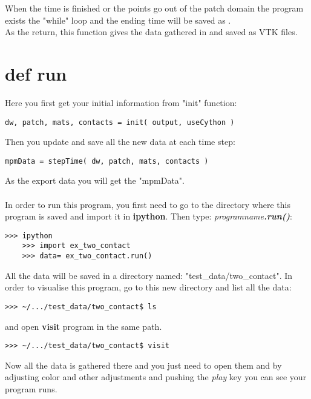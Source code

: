 When the time is finished or the points go out of the patch domain the program exists the "while" loop and the ending time will be saved as .\\
As the return, this function gives the data gathered in  and saved as VTK files.
\section{def run}
Here you first get your initial information from "init" function:
\begin{lstlisting}
dw, patch, mats, contacts = init( output, useCython )
\end{lstlisting}
Then you update and save all the new data at each time step:
\begin{lstlisting}
mpmData = stepTime( dw, patch, mats, contacts )
\end{lstlisting}

As the export data you will get the "mpmData".\\ \\ 


In order to run this program, you first need to go to the directory where this program is saved and import it in \textbf{ipython}. Then type: \emph{programname}\textbf{\emph{.run()}}:
\begin{lstlisting}
>>> ipython
	>>> import ex_two_contact
	>>> data= ex_two_contact.run()
\end{lstlisting}
All the data will be saved in a directory named: "test\_data/two\_contact". In order to visualise this program, go to this new directory and list all the data:
\begin{lstlisting}
>>> ~/.../test_data/two_contact$ ls
\end{lstlisting}
and open \textbf{visit} program in the same path. 
\begin{lstlisting}
>>> ~/.../test_data/two_contact$ visit
\end{lstlisting}
Now all the data is gathered there and you just need to open them and by adjusting color and other adjustments and pushing the \emph{play} key you can see your program runs. 
